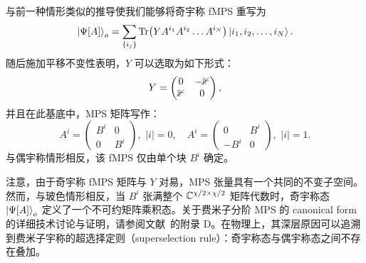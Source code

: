 与前一种情形类似的推导使我们能够将奇宇称 fMPS 重写为
\begin{equation}
    \ket{\Psi[A]}_o = \sum_{\{i_j\}} {\rm Tr}\big(YA^{i_1}A^{i_2}\dots A^{i_N}\big) \ket{i_1,i_2,\dots,i_N}.
\end{equation}
随后施加平移不变性表明，$Y$ 可以选取为如下形式：
\begin{equation}\label{eq:fMPSY}
    Y =
    \begin{pmatrix}
        0 & -\mathbb 1 \\ \mathbb 1 & 0
    \end{pmatrix},
\end{equation}
并且在此基底中，MPS 矩阵写作：
\begin{equation}
    A^i =
    \begin{pmatrix}
        B^i & 0 \\
        0 & B^i
    \end{pmatrix}, \,\, \lvert i \rvert = 0, \quad
    A^i =
    \begin{pmatrix}
        0 & B^i \\
        -B^i & 0
    \end{pmatrix}, \,\, \lvert i \rvert = 1.
\end{equation}
与偶宇称情形相反，该 fMPS 仅由单个块 $B^i$ 确定。

注意，由于奇宇称 fMPS 矩阵与 $Y$ 对易，MPS 张量具有一个共同的不变子空间。然而，与玻色情形相反，当 $B^i$ 张满整个 $\mathbb C^{\chi/2\times \chi/2}$ 矩阵代数时，奇宇称态 $\ket{\Psi[A]}_o$ 定义了一个不可约矩阵乘积态。关于费米子分阶 MPS 的 canonical form 的详细技术讨论与证明，请参阅文献~\cite{Piroli2020}的附录 D。在物理上，其深层原因可以追溯到费米子宇称的超选择定则（superselection rule）：奇宇称态与偶宇称态之间不存在叠加。

